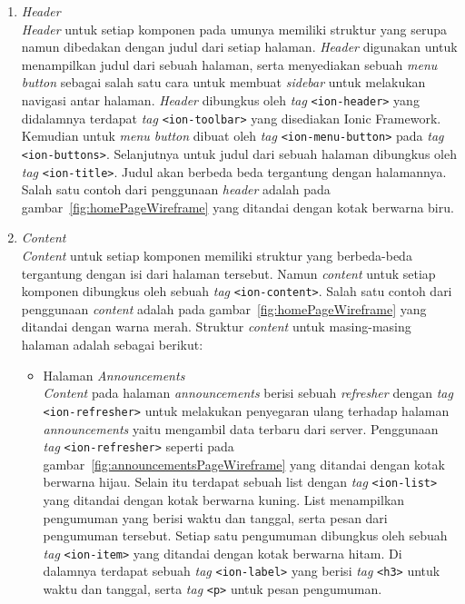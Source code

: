 	\begin{enumerate}
		\item \textit{Header} \\
			\textit{Header} untuk setiap komponen pada umunya memiliki struktur yang serupa namun dibedakan dengan judul dari setiap halaman. \textit{Header} digunakan untuk menampilkan judul dari sebuah halaman, serta menyediakan sebuah \textit{menu button} sebagai salah satu cara untuk membuat \textit{sidebar} untuk melakukan navigasi antar halaman. \textit{Header} dibungkus oleh \textit{tag} \texttt{<ion-header>} yang didalamnya terdapat \textit{tag} \texttt{<ion-toolbar>} yang disediakan Ionic Framework. Kemudian untuk \textit{menu button} dibuat oleh \textit{tag} \texttt{<ion-menu-button>} pada \textit{tag} \texttt{<ion-buttons>}. Selanjutnya untuk judul dari sebuah halaman dibungkus oleh \textit{tag} \texttt{<ion-title>}. Judul akan berbeda beda tergantung dengan halamannya. Salah satu contoh dari penggunaan \textit{header} adalah pada gambar~\ref{fig:homePageWireframe} yang ditandai dengan kotak berwarna biru.
			
		\item \textit{Content} \\
			\textit{Content} untuk setiap komponen memiliki struktur yang berbeda-beda tergantung dengan isi dari halaman tersebut. Namun \textit{content} untuk setiap komponen dibungkus oleh sebuah \textit{tag} \texttt{<ion-content>}. Salah satu contoh dari penggunaan \textit{content} adalah pada gambar~\ref{fig:homePageWireframe} yang ditandai dengan warna merah. Struktur \textit{content} untuk masing-masing halaman adalah sebagai berikut:
			
			\begin{itemize}
				\item Halaman \textit{Announcements} \\
					\textit{Content} pada halaman \textit{announcements} berisi sebuah \textit{refresher} dengan \textit{tag} \texttt{<ion-refresher>} untuk melakukan penyegaran ulang terhadap halaman \textit{announcements} yaitu mengambil data terbaru dari server. Penggunaan \textit{tag} \texttt{<ion-refresher>} seperti pada gambar~\ref{fig:announcementsPageWireframe} yang ditandai dengan kotak berwarna hijau. Selain itu terdapat sebuah list dengan \textit{tag} \texttt{<ion-list>} yang ditandai dengan kotak berwarna kuning. List menampilkan pengumuman yang berisi waktu dan tanggal, serta pesan dari pengumuman tersebut. Setiap satu pengumuman dibungkus oleh sebuah \textit{tag} \texttt{<ion-item>} yang ditandai dengan kotak berwarna hitam. Di dalamnya terdapat sebuah \textit{tag} \texttt{<ion-label>} yang berisi \textit{tag} \texttt{<h3>} untuk waktu dan tanggal, serta \textit{tag} \texttt{<p>} untuk pesan pengumuman.		
				

\end{itemize}
\end{enumerate}

